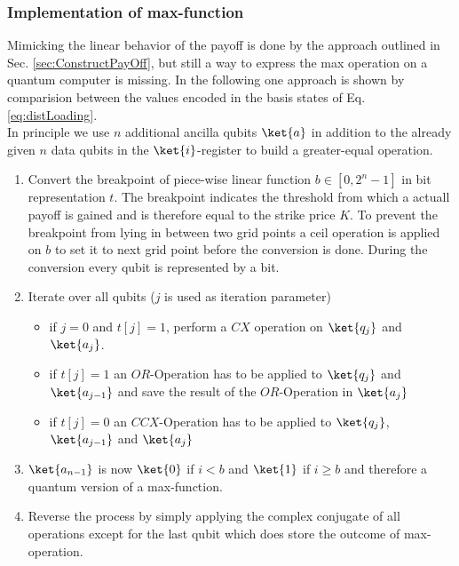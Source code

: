 \documentclass[../../main.tex]{subfiles}
\begin{document}
\subsubsection{Implementation of max-function}\label{sec:ImplMaxFunc}

Mimicking the linear behavior of the payoff is done by the approach outlined in Sec. \ref{sec:ConstructPayOff}, but still a way to express the max operation
on a quantum computer is missing. In the following one approach is shown by comparision between the values encoded in the basis states of Eq. \ref{eq:distLoading}.\\
In principle we use $n$ additional ancilla qubits $\ket{a}$ in addition to the already given $n$ data qubits in the $\ket{i}$-register to build a greater-equal operation.
\begin{enumerate}
  \item Convert the breakpoint of piece-wise linear function $b \in [0,2^n-1]$ in bit representation $t$. The breakpoint indicates the threshold from which a actuall payoff is gained and is therefore equal to the strike price $K$.
  To prevent the breakpoint from lying in between two grid points a ceil operation is applied on $b$ to set it to next grid point before the conversion is done. During the conversion every qubit is represented by a bit.
  \item Iterate over all qubits ($j$ is used as iteration parameter)
  \begin{itemize}
    \item if $j=0$ and $t[j]=1$, perform a $CX$ operation on $\ket{q_j}$ and $\ket{a_j}$.
    \item if $t[j]=1$ an $OR$-Operation has to be applied to $\ket{q_j}$ and $\ket{a_{j-1}}$ and save the result of the $OR$-Operation in $\ket{a_j}$
    \item if $t[j]=0$ an $CCX$-Operation has to be applied to $\ket{q_j}$, $\ket{a_{j-1}}$ and $\ket{a_j}$
  \end{itemize}
  \item $\ket{a_{n-1}}$ is now $\ket{0}$ if $i<b$ and $\ket{1}$ if $i\geq b$ and therefore a quantum version of a max-function.
  \item Reverse the process by simply applying the complex conjugate of all operations except for the last qubit which does store the outcome of max-operation.
\end{enumerate}
\end{document}
